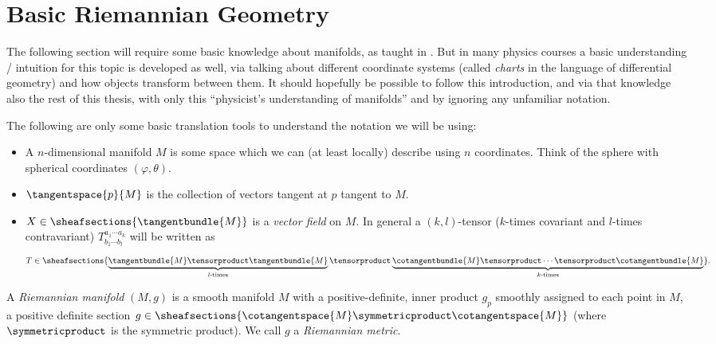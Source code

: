 \documentclass[titlepage,numbers=noenddot,headinclude,oneside,%
footinclude=true,cleardoublepage=empty,%
BCOR=5mm,paper=a4,fontsize=11pt,%
english,%
]{scrartcl}
\begin{document}
\section{Basic Riemannian Geometry}\label{sec:basic_riemannian_geometry}
\begin{remark}\label{rem:manifolds_physicists_intuition}
    The following section will require some basic knowledge about manifolds, as \eg taught in \cite{leeIntroductionSmoothManifolds2012}. But in many physics courses a basic understanding / intuition for this topic is developed as well, via talking about different coordinate systems (called \emph{charts} in the language of differential geometry) and how objects transform between them. It should hopefully be possible to follow this introduction, and via that knowledge also the rest of this thesis, with only this \enquote{physicist's understanding of manifolds} and by ignoring any unfamiliar notation.

    The following are only some basic translation tools to understand the notation we will be using:
    \begin{itemize}
        \item A \( n \)-dimensional manifold \( M \) is some space which we can (at least locally) describe using \( n \) coordinates. Think \eg of the sphere with spherical coordinates \( (\varphi,\theta) \).
        \item \( \tangentspace{p}{M} \) is the collection of vectors tangent at \( p \) tangent to \( M \). 
        \item \( X\in \sheafsections{\tangentbundle{M}} \) is a \emph{vector field} on \( M \). In general a \( (k,l) \)-tensor (\( k \)-times covariant and \( l \)-times contravariant) \( T^{a_1\dotsm a_k}_{b_1\dotsm b_l} \) will be written as 
        \begin{equation*}
            T\in \sheafsections{\underbrace{\tangentbundle{M}\tensorproduct \tangentbundle{M}}_{l \text{-times}}\tensorproduct \underbrace{\cotangentbundle{M}\tensorproduct\dotsb\tensorproduct \cotangentbundle{M}}_{k \text{-times}}}.
        \end{equation*}
    \end{itemize}
\end{remark}
\begin{definition}\label{def:riemannian_metric}\label{def:riemannian_manifold}
    A \emph{Riemannian manifold} \( (M,g) \) is a smooth manifold \( M \) with a positive-definite, inner product \( g_p \) smoothly assigned to each point in \( M \), \ie a positive definite section \(g\in \sheafsections{\cotangentspace{M}\symmetricproduct \cotangentspace{M}} \) (where \( \symmetricproduct \) is the symmetric product). We call \( g \) a \emph{Riemannian metric}.
\end{definition}
\end{document}

